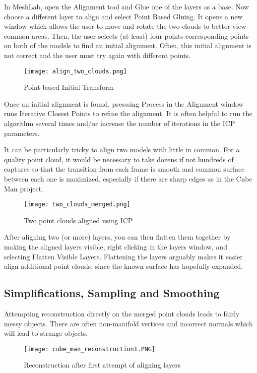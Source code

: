 In MeshLab, open the Alignment tool and Glue one of the layers as a base.
Now choose a different layer to align and select Point Based Gluing.
It opens a new window which allows the user to move and rotate the two clouds to better view
common areas. Then, the user selects (at least) four points corresponding points on
both of the models to find an initial alignment.
Often, this initial alignment is not correct and the user must try again
with different points.

\begin{figure}[h]
\centering
\texttt{[image: align\_two\_clouds.png]}
\caption{Point-based Initial Transform}
\end{figure}

Once an initial alignment is found, presssing Process in the Alignment window
runs Iterative Closest Points to refine the alignment. It is often helpful
to run the algorithm several times and/or increase the number of iterations in the
ICP parameters.

It can be particularly tricky to align two models with little in common. For a
quality point cloud, it would be necessary to take dozens if not hundreds
of captures so that the transition from each frame is smooth and common surface
between each one is maximized, especially if there are sharp edges as in the
Cube Man project.

\begin{figure}[H]
\centering
\texttt{[image: two\_clouds\_merged.png]}
\caption{Two point clouds aligned using ICP}
\end{figure}

After aligning two (or more) layers, you can then flatten them together by making
the aligned layers visible, right clicking in the layers window, and selecting
Flatten Visible Layers. Flattening the layers arguably makes it easier align additional
point clouds, since the known surface has hopefully expanded.

\subsection{Simplifications, Sampling and Smoothing}
Attempting reconstruction directly on the merged point clouds leads to fairly messy
objects. There are often non-manifold vertices and incorrect normals which will lead to
strange objects.

\begin{figure}[H]
\centering
\texttt{[image: cube\_man\_reconstruction1.PNG]}
\caption{Reconstruction after first attempt of aligning layers}
\end{figure}

